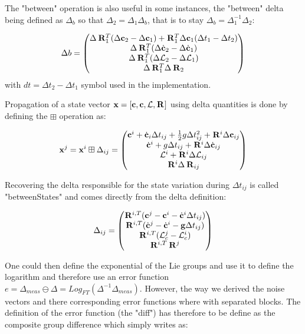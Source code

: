 \documentclass[11pt]{article}
\newcommand{\Rot}[2]{\prescript{#1}{}{\bfR}_{#2}}
\newcommand{\AM}{\mathcal{L}}
\newcommand{\COM}{\bfc}
\newcommand{\COMd}{\dot{\bfc}}
\begin{document}
The "between" operation is also useful in some instances, the "between" delta being defined as $\Delta_b$ so that $\Delta_2 = \Delta_1 \Delta_b$, that is to stay $\Delta_b = \Delta^{-1}_1 \Delta_2$:

\begin{equation}
\Delta b = 
	\begin{pmatrix}
	\Delta \Rot{}{1}^T(\Delta \COM_2 - \Delta \COM_1) + \Rot{}{1}^T \Delta \COM_1 (\Delta t_1 - \Delta t_2)
	\\
	\Delta \Rot{}{1}^T(\Delta \COMd_2 - \Delta \COMd_1)
	\\
	\Delta \Rot{}{1}^T(\Delta \AM_2 - \Delta \AM_1)
	\\
	\Delta \Rot{}{1}^T \Delta \Rot{}{2}
	\end{pmatrix}
\end{equation}
with $dt = \Delta t_2 - \Delta t_1$ symbol used in the implementation.

Propagation of a state vector $\bfx = [\COM, \COM, \AM, \Rot{}{}]$ using delta quantities is done by defining the $\boxplus$ operation as:

\begin{equation}
	\bfx^j = \bfx^i \boxplus \Delta_{ij} =
	\begin{pmatrix}
	\COM^i + \COMd_i \Delta t_{ij} + \frac{1}{2} g \Delta t_{ij}^2 + \Rot{}{}^i \Delta \COM_{ij}
	\\
	\COMd^i + g \Delta t_{ij} + \Rot{}{}^i \Delta \COMd_{ij}
	\\
	\AM^i + \Rot{}{}^i \Delta \AM_{ij}
	\\
	\Rot{}{}^i \Delta \Rot{}{ij}
	\end{pmatrix}
\end{equation}

Recovering the delta responsible for the state variation during $\Delta t_{ij}$ is called "betweenStates" and comes directly from the delta definition:

\begin{equation}
\Delta_{ij} =
\begin{pmatrix}
	\Rot{}{}^{i,T} (\COM^j - \COM^i - \COMd{}{}^i \Delta t_{ij})
	\\
	\Rot{}{}^{i,T} (\COMd^{j} - \COMd^{i} - \bfg \Delta t_{ij})
	\\
	\Rot{}{}^{i,T} (\AM_c^{j} - \AM_c^{i})
	\\
\Rot{}{}^{i,T} \Rot{}{}^{j}
\end{pmatrix}
\end{equation}


One could then define the exponential of the Lie groups and use it to define the logarithm and therefore use an error function $e = \Delta_{meas} \ominus \Delta =  Log_{FT}(\Delta^{-1} \Delta_{meas})$. However, the way we derived the noise vectors and there corresponding error functions where with separated blocks. The definition of the error function (the "diff") has therefore to be define as the composite group difference which simply writes as:
\end{document}
